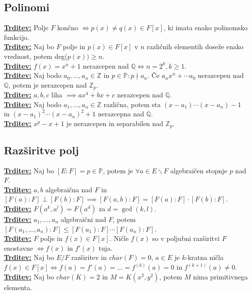 \documentclass[a4paper,oneside,8pt,landscape]{extarticle}
\let\oldtextbf\textbf
\renewcommand{\textbf}[1]{\oldtextbf{\boldmath #1}}
\newcommand{\trditev}[1]{\textbf{\underline{Trditev:} }{#1}\\}
\begin{document}
\begin{multicols*}{3}
\subsection*{Polinomi}
\trditev{Polje $F$ končno $\iff p(x)\neq q(x)\in F[x]$, ki imata enako polinomsko funkcijo.}
\trditev{Naj bo $F$ polje in $p(x)\in F[x]$ v $n$ različnih elementih doseže enako vrednost, potem deg($p(x))\geq n$.}
\trditev{$f(x) = x^n+1$ nerazcepen nad $\mathbb{Q} \iff n = 2^k, k\geq 1$.}
\trditev{Naj bodo $a_0,\dots, a_n \in \mathbb{Z}$ in $p\in\mathbb{P}: p\nmid a_n$. Če $a_nx^n+\cdots a_0$ nerazcepen nad $\mathbb{Q}$, potem je nerazcepen nad $\mathbb{Z}_p$.}
\trditev{$a,b,c$ liha $\implies ax^4 + bx + c$ nerazcepen nad $\mathbb{Q}$.}
\trditev{Naj bodo $a_1,\dots, a_n\in \mathbb{Z}$ različna, potem sta $(x-a_1)\cdots (x-a_n)-1$ in $(x-a_1)^2\cdots (x-a_n)^2+1$ nerazcepna nad $\mathbb{Q}$.}
\trditev{$x^p-x+1$ je nerazcepen in separabilen nad $\mathbb{Z}_p$.}
\vspace{-15pt}
\subsection*{Razširitve polj}
\trditev{Naj bo $[E:F]=p\in\mathbb{P}$, potem je $\forall a\in E\backslash F$ algebraičen stopnje $p$ nad $F$.}
\trditev{$a,b$ algebraična nad $F$ in $[F(a):F] \perp [F(b):F] \implies [F(a,b):F] = [F(a):F]\cdot [F(b):F]$.}
\trditev{$F(a^k, a^l) = F(a^d)$ za $d=\gcd(k,l)$.}
\trditev{$a_1,\dots,a_n$ algebraični nad $F$, potem $[F(a_1,\dots,a_n):F]\leq [F(a_1):F]\cdots [F(a_n):F]$.}
\trditev{$F$ polje in $f(x)\in F[x]$. Ničle $f(x)$ so v poljubni razširitvi $F$ enostavne $\iff f(x)$ in $f'(x)$ tuja.}
\trditev{Naj bo $E/F$ razširitev in $char(F)=0$, $a\in E$ je $k$-kratna ničla $f(x)\in F[x] \iff f(a) = f'(a) =\dots = f^{(k)}(a) =0$ in $f^{(k+1)}(a)\neq 0$.}
\trditev{Naj bo $char(K) =2$ in $M = K(x^2,y^2)$, potem $M$ nima primitivnega elementa.}
\vspace{-15pt}

\end{multicols*}
\end{document}
